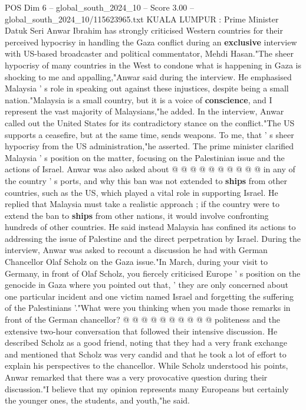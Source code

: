 \begin{textsample}{POS Dim 6 – global\_south\_2024\_10 – Score 3.00 – global\_south\_2024\_10/115623965.txt}  \label{ex:f6_pos_406}
KUALA LUMPUR : Prime Minister Datuk Seri Anwar Ibrahim has strongly criticised Western countries for their perceived hypocrisy in handling the Gaza conflict during an \textbf{exclusive} interview with US-based broadcaster and political commentator, Mehdi Hasan."The sheer hypocrisy of many countries in the West to condone what is happening in Gaza is shocking to me and appalling,"Anwar said during the interview.
He emphasised Malaysia ' s role in speaking out against these injustices, despite being a small nation."Malaysia is a small country, but it is a voice of \textbf{conscience}, and I represent the vast majority of Malaysians,"he added.
In the interview, Anwar called out the United States for its contradictory stance on the conflict."The US supports a ceasefire, but at the same time, sends weapons.
To me, that ' s sheer hypocrisy from the US administration,"he asserted.
The prime minister clarified Malaysia ' s position on the matter, focusing on the Palestinian issue and the actions of Israel.
Anwar was also asked about @ @ @ @ @ @ @ @ @ @ in any of the country ' s ports, and why this ban was not extended to \textbf{ships} from other countries, such as the US, which played a vital role in supporting Israel.
He replied that Malaysia must take a realistic approach ; if the country were to extend the ban to \textbf{ships} from other nations, it would involve confronting hundreds of other countries.
He said instead Malaysia has confined its actions to addressing the issue of Palestine and the direct perpetration by Israel.
During the interview, Anwar was asked to recount a discussion he had with German Chancellor Olaf Scholz on the Gaza issue."In March, during your visit to Germany, in front of Olaf Scholz, you fiercely criticised Europe ' s position on the genocide in Gaza where you pointed out that, ' they are only concerned about one particular incident and one victim named Israel and forgetting the suffering of the Palestinians '."What were you thinking when you made those remarks in front of the German chancellor? @ @ @ @ @ @ @ @ @ @ politeness and the extensive two-hour conversation that followed their intensive discussion.
He described Scholz as a good friend, noting that they had a very frank exchange and mentioned that Scholz was very candid and that he took a lot of effort to explain his perspectives to the chancellor.
While Scholz understood his points, Anwar remarked that there was a very provocative question during their discussion."I believe that my opinion represents many Europeans but certainly the younger ones, the students, and youth,"he said.

\end{textsample}
